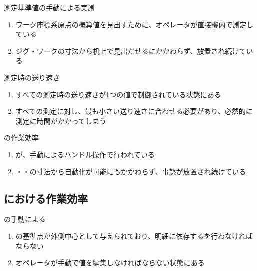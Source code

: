 \begin{Issues}{測定基準値の手動による実測}
\begin{enumerate}[label=\sarrow]
\item[{\sarrow[red]}]ワーク座標系原点の概算値を見出すために、オペレータが直接機内で測定している
\item[{\sarrow[red]}]ジグ・ワークの寸法から机上で見出だせるにかかわらず、放置され続けている
\end{enumerate}
\end{Issues}

\begin{Issues}{測定時の送り速さ}
\begin{enumerate}[label=\sarrow]
\item[{\sarrow[red]}]すべての測定時の送り速さが1つの値で制御されている状態にある
\item[{\sarrow[red]}]すべての測定に対し、最も小さい送り速さに合わせる必要があり、必然的に測定に時間がかかってしまう
\end{enumerate}
\end{Issues}

\begin{Issues}{\CenterlineEndFaceDifMeasurement の作業効率}
\begin{enumerate}[label=\sarrow]
\item[{\sarrow[red]}]\CenterlineEndFaceDifMeasurement が、手動によるハンドル操作で行われている
\item[{\sarrow[red]}]\Outcut・\Keyway・\CenterCurvature の寸法から自動化が可能にもかかわらず、事態が放置され続けている
\end{enumerate}
\end{Issues}


\clearpage
\subsection{\EndFacecutMilling における作業効率}

\begin{Issues}{\EndFacecutMilling の手動による\TDCorrection}
\begin{enumerate}[label=\sarrow]
\item[{\sarrow[red]}]\EndFacecutMilling の基準点が外側中心として与えられており、明細に依存する\indexTDFaceMill\nameTDCorrection を行わなければならない
\item[{\sarrow[red]}]オペレータが手動で\indexTDFaceMill\nameTDCorrection 値を編集しなければならない状態にある
\end{enumerate}
\end{Issues}

